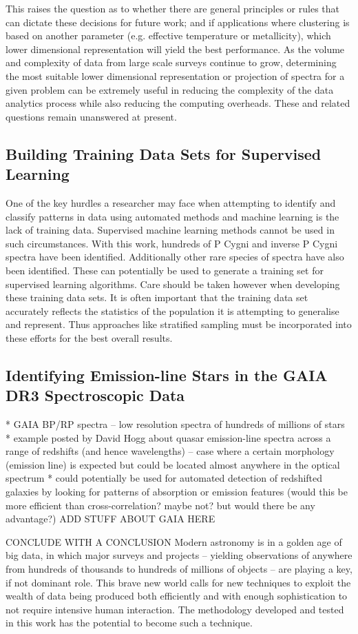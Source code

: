 This raises the question as to whether there are general principles or rules that can dictate these decisions for future work; and if applications where clustering is based on another parameter (e.g. effective temperature or metallicity), which lower dimensional representation will yield the best performance. As the volume and complexity of data from large scale surveys continue to grow, determining the most suitable lower dimensional representation or projection of spectra for a given problem can be extremely useful in reducing the complexity of the data analytics process while also reducing the computing overheads. These and related questions remain unanswered at present.

\subsection{Building Training Data Sets for Supervised Learning}

One of the key hurdles a researcher may face when attempting to identify and classify patterns in data using automated methods and machine learning is the lack of training data. Supervised machine learning methods cannot be used in such circumstances. With this work, hundreds of P Cygni and inverse P Cygni spectra have been identified. Additionally other rare species of spectra have also been identified. These can potentially be used to generate a training set for supervised learning algorithms. Care should be taken however when developing these training data sets. It is often important that the training data set accurately reflects the statistics of the population it is attempting to generalise and represent. Thus approaches like stratified sampling must be incorporated into these efforts for the best overall results. 

\subsection{Identifying Emission-line Stars in the GAIA DR3 Spectroscopic Data}

* GAIA BP/RP spectra -- low resolution spectra of hundreds of millions of stars
* example posted by David Hogg about quasar emission-line spectra across a range of redshifts (and hence wavelengths) -- case where a certain morphology (emission line) is expected but could be located almost anywhere in the optical spectrum
* could potentially be used for automated detection of redshifted galaxies by looking for patterns of absorption or emission features (would this be more efficient than cross-correlation? maybe not? but would there be any advantage?)
ADD STUFF ABOUT GAIA HERE

CONCLUDE WITH A CONCLUSION 
Modern astronomy is in a golden age of big data, in which major surveys and projects -- yielding observations of anywhere from hundreds of thousands to hundreds of millions of objects -- are playing a key, if not dominant role. This brave new world calls for new techniques to exploit the wealth of data being produced both efficiently and with enough sophistication to not require intensive human interaction. The methodology developed and tested in this work has the potential to become such a technique.